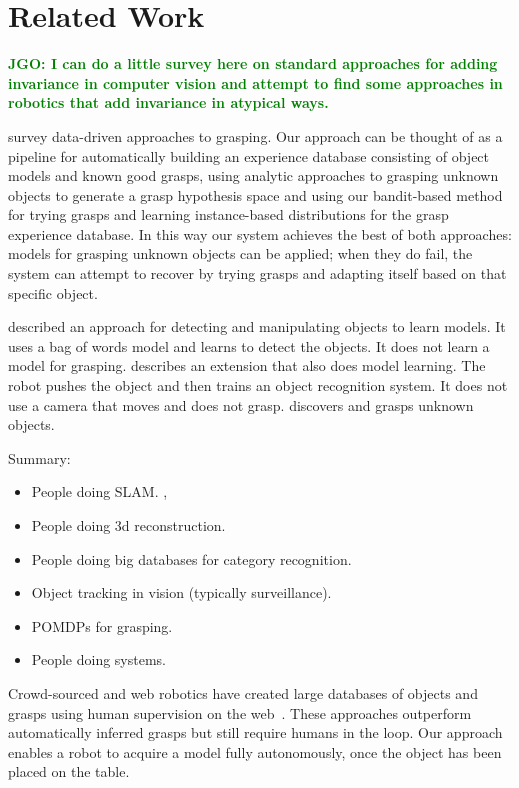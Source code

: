 \documentclass[graybox]{svmult}
\newcommand{\jgonote}[1]{\textcolor{green}{\textbf{JGO: #1}}}
\begin{document}
\section{Related Work}

\label{sec:relatedwork}
\jgonote{I can do a little survey here on standard approaches for adding
invariance in computer vision and attempt to find some approaches in robotics
that add invariance in atypical ways.}

\citet{bohg13} survey data-driven approaches to grasping.  Our
approach can be thought of as a pipeline for automatically building an
experience database consisting of object models and known good grasps,
using analytic approaches to grasping unknown objects to generate a
grasp hypothesis space and using our bandit-based method for trying
grasps and learning instance-based distributions for the grasp
experience database.  In this way our system achieves the best of both
approaches: models for grasping unknown objects can be applied; when
they do fail, the system can attempt to recover by trying grasps and
adapting itself based on that specific object.  

\citet{ude12} described an approach for detecting and manipulating
objects to learn models.  It uses a bag of words model and learns to
detect the objects.  It does not learn a model for grasping.
\citet{schiebener13} describes an extension that also does model
learning.  The robot pushes the object and then trains an object
recognition system.  It does not use a camera that moves and does not
grasp.
\citet{schiebener12} discovers and grasps unknown objects.

Summary: 
\begin{itemize}
\item People doing SLAM.  \citet{wang07, gallagher09}, 
\item People doing 3d reconstruction.   \citet{krainin11, banta00}
\item People doing big databases for category recognition.  \citet{kent14a, kent14, lai11a, goldfeder09}
\item Object tracking in vision (typically surveillance).
\item POMDPs for grasping.  \citet{platt11, hsiao10}
\item People doing systems.  \citet{hudson12, ciocarlie14}
\end{itemize}




Crowd-sourced and web robotics have created large databases of objects
and grasps using human supervision on the web~\citep{kent14a, kent14}.
These approaches outperform automatically inferred grasps but still
require humans in the loop.  Our approach enables a robot to acquire a
model fully autonomously, once the object has been placed on the
table.
\end{document}
